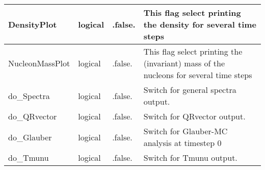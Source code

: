 \documentclass{article}
\begin{document}
\begin{longtable}{llll}
\midrule
DensityPlot & \begin{minipage}[t]{2cm}logical\end{minipage} & \begin{minipage}[t]{2cm}.false.\end{minipage} & \begin{minipage}[t]{12cm}This flag select printing the density for several time steps\end{minipage}\\*
\midrule
NucleonMassPlot & \begin{minipage}[t]{2cm}logical\end{minipage} & \begin{minipage}[t]{2cm}.false.\end{minipage} & \begin{minipage}[t]{12cm}This flag select printing the (invariant) mass of the nucleons for several time steps\end{minipage}\\*
\midrule
do\_Spectra & \begin{minipage}[t]{2cm}logical\end{minipage} & \begin{minipage}[t]{2cm}.false.\end{minipage} & \begin{minipage}[t]{12cm}Switch for general spectra output.\end{minipage}\\*
\midrule
do\_QRvector & \begin{minipage}[t]{2cm}logical\end{minipage} & \begin{minipage}[t]{2cm}.false.\end{minipage} & \begin{minipage}[t]{12cm}Switch for QRvector output.\end{minipage}\\*
\midrule
do\_Glauber & \begin{minipage}[t]{2cm}logical\end{minipage} & \begin{minipage}[t]{2cm}.false.\end{minipage} & \begin{minipage}[t]{12cm}Switch for Glauber-MC analysis at timestep 0\end{minipage}\\*
\midrule
do\_Tmunu & \begin{minipage}[t]{2cm}logical\end{minipage} & \begin{minipage}[t]{2cm}.false.\end{minipage} & \begin{minipage}[t]{12cm}Switch for Tmunu output.\end{minipage}\\*

\end{longtable}
\end{document}
